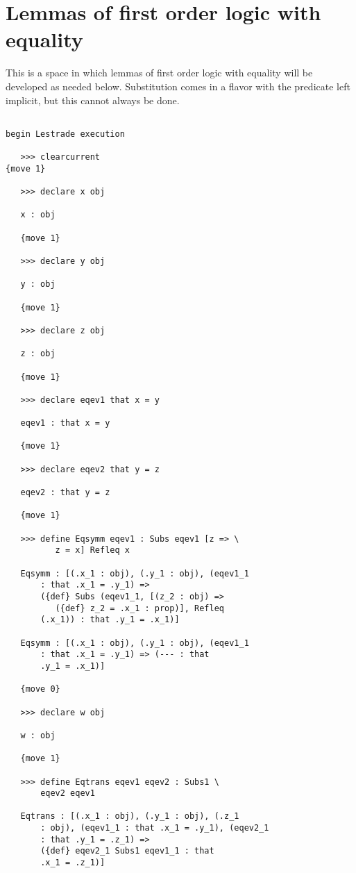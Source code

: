 \documentclass[12pt]{article}
\begin{document}
\section{Lemmas of first order logic with equality}

This is a space in which lemmas of first order logic with equality will be developed as needed below.  Substitution comes in a flavor with the predicate left implicit, but this cannot always be done.

\begin{verbatim}

begin Lestrade execution

   >>> clearcurrent
{move 1}

   >>> declare x obj

   x : obj

   {move 1}

   >>> declare y obj

   y : obj

   {move 1}

   >>> declare z obj

   z : obj

   {move 1}

   >>> declare eqev1 that x = y

   eqev1 : that x = y

   {move 1}

   >>> declare eqev2 that y = z

   eqev2 : that y = z

   {move 1}

   >>> define Eqsymm eqev1 : Subs eqev1 [z => \
          z = x] Refleq x

   Eqsymm : [(.x_1 : obj), (.y_1 : obj), (eqev1_1 
       : that .x_1 = .y_1) => 
       ({def} Subs (eqev1_1, [(z_2 : obj) => 
          ({def} z_2 = .x_1 : prop)], Refleq 
       (.x_1)) : that .y_1 = .x_1)]

   Eqsymm : [(.x_1 : obj), (.y_1 : obj), (eqev1_1 
       : that .x_1 = .y_1) => (--- : that 
       .y_1 = .x_1)]

   {move 0}

   >>> declare w obj

   w : obj

   {move 1}

   >>> define Eqtrans eqev1 eqev2 : Subs1 \
       eqev2 eqev1

   Eqtrans : [(.x_1 : obj), (.y_1 : obj), (.z_1 
       : obj), (eqev1_1 : that .x_1 = .y_1), (eqev2_1 
       : that .y_1 = .z_1) => 
       ({def} eqev2_1 Subs1 eqev1_1 : that 
       .x_1 = .z_1)]


\end{verbatim}
\end{document}
